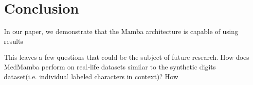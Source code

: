 \section{Conclusion}
In our paper, we demonstrate that the Mamba architecture is capable of using
results 

This leaves a few questions that could be the subject of future research.
How does MedMamba perform on real-life datasets similar to the synthetic digits
dataset(i.e. individual labeled characters in context)?
How 
